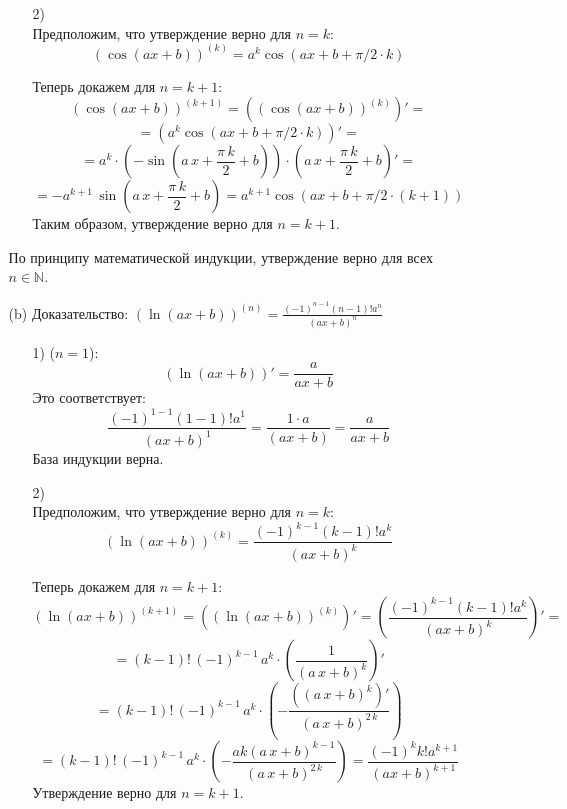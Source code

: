 \documentclass[a4paper]{article}
\begin{document}
\begin{enumerate}
\begin{enumerate}
\begin{enumerate}
            \item[2)]
             \\
            Предположим, что утверждение верно для $n=k$:
            $$
            (\cos (a x + b))^{(k)} = a^k \cos (a x + b + \pi/2 \cdot k)
            $$
            
            Теперь докажем для $n=k+1$:
            $$
            (\cos (a x + b))^{(k+1)} = ((\cos (a x + b))^{(k)})' = 
            $$
            $$=(a^k \cos (a x + b + \pi/2 \cdot k))' = $$
            $$={a}^{k}\cdot \left(-\sin\left(a\,x+\frac{\pi\,k}{2}+b\right)\right)\cdot \left(a\,x+\dfrac{\pi\,k}{2}+b\right)' = $$
            $$=-{a}^{k+1}\,\sin\left(a\,x+\frac{\pi\,k}{2}+b\right) = a^{k+1} \cos (a x + b + \pi/2 \cdot (k+1))$$
            Таким образом, утверждение верно для $n=k+1$.
        \end{enumerate}

        По принципу математической индукции, утверждение верно для всех $n \in \mathbb{N}$.

        \item[(b)]Доказательство: $(\ln (a x+b))^{(n)}=\frac{(-1)^{n-1}(n-1)!a^{n}}{(a x+b)^{n}}$
        \begin{enumerate}
            \item[1)]
             ($n=1$):
            $$
            (\ln (a x + b))' = \frac{a}{a x + b}
            $$
            Это соответствует:
            $$
            \frac{(-1)^{1-1}(1-1)!a^{1}}{(a x + b)^{1}} = \frac{1 \cdot a}{(a x + b)} = \frac{a}{a x + b}
            $$
            База индукции верна.

            \item[2)]
             \\
            Предположим, что утверждение верно для $n=k$:
            $$
            (\ln (a x + b))^{(k)} = \frac{(-1)^{k-1}(k-1)!a^{k}}{(a x + b)^{k}}
            $$
            
            Теперь докажем для $n=k+1$:
            $$
            (\ln (a x + b))^{(k+1)} = ((\ln (a x + b))^{(k)})' = \left(\frac{(-1)^{k-1}(k-1)!a^{k}}{(a x + b)^{k}}\right)' =
            $$
            $$
            = (k-1)!\,\left({-1}\right)^{k-1}\,{a}^{k}\cdot \left(\dfrac{1}{\left({a\,x+b}\right)^{k}}\right)'
            $$
            $$
            = (k-1)!\,\left({-1}\right)^{k-1}\,{a}^{k}\cdot\left(-\frac{\left(\left({a\,x+b}\right)^{k}\right)'}{\left({a\,x+b}\right)^{2\,k}}\right)
            $$
            $$
            = (k-1)!\,\left({-1}\right)^{k-1}\,{a}^{k}\cdot\left(-\frac{ak\left({a\,x+b}\right)^{k-1}}{\left({a\,x+b}\right)^{2\,k}}\right) = \frac{(-1)^{k}k!a^{k+1}}{(a x + b)^{k+1}}
            $$
            Утверждение верно для $n=k+1$.
        \end{enumerate}
    

\end{enumerate}
\end{enumerate}
\end{document}
